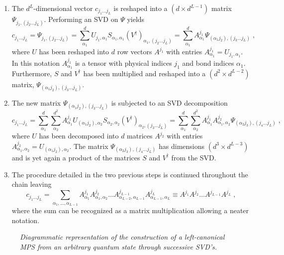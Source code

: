 \begin{enumerate}
\item
The $d^L$-dimensional vector $c_{j_1 \ldots j_L}$ is reshaped into a $(d \times d^{L-1})$ matrix $\Psi_{j_1 , (j_2 \ldots j_L)}$. Performing an SVD on $\Psi$ yields
\begin{equation}
	c_{j_1 \ldots j_L} = \Psi_{j_1 , (j_2 \ldots j_L)} = \sum_{\alpha_1}^{d} U_{j_1 , \alpha_1} S_{\alpha_1 , \alpha_1} (V^{\dag})_{\alpha_1 , (j_2 \ldots j_L)} = \sum_{\alpha_1}^{d} A_{\alpha_1}^{j_1} \Psi_{(\alpha_1 j_2),(j_3 \ldots j_L)} \; ,
\end{equation}
where $U$ has been reshaped into $d$ row vectors $A^{j_1}$ with entries $A_{\alpha_1}^{j_1} = U_{j_1 , \alpha_1}$. In this notation $A_{\alpha_1}^{j_1}$ is a tensor with physical indices $j_1$ and bond indices $\alpha_1$. Furthermore, $S$ and $V^{\dag}$ has been multiplied and reshaped into a $(d^2 \times d^{L-2})$ matrix, $\Psi_{(\alpha_1 j_2),(j_3 \ldots j_L)}$.

\item
The new matrix $\Psi_{(\alpha_1 j_2),(j_3 \ldots j_L)}$ is subjected to an SVD decomposition
\begin{equation}
	c_{j_1 \ldots j_L} = \sum_{\alpha_1}^{d} \sum_{\alpha_2}^{d^2} A_{\alpha_1}^{j_1} U_{(\alpha_1 j_2) , \alpha_2} S_{\alpha_2 , \alpha_2} (V^{\dag})_{\alpha_2 , (j_3 \ldots j_L)} = \sum_{\alpha_1}^{d} \sum_{\alpha_2}^{d^2} A_{\alpha_1}^{j_1} A_{\alpha_1 , \alpha_2}^{j_2} \Psi_{(\alpha_2 j_3),(j_4 \ldots j_L)} \; ,
\end{equation}
where $U$ has been decomposed into $d$ matrices $A^{j_2}$ with entries $A_{\alpha_1 , \alpha_2}^{j_2} = U_{(\alpha_1 j_2) , \alpha_2}$. The matrix $\Psi_{(\alpha_2 j_3),(j_4 \ldots j_L)}$ has dimensions $(d^3 \times d^{L-3})$ and is yet again a product of the matrices $S$ and $V^{\dag}$ from the SVD.

\item
The procedure detailed in the two previous steps is continued throughout the chain leaving 
\begin{equation}
	c_{j_1 \ldots j_L} = \sum_{\alpha_1 , \ldots , \alpha_{L-1}} A_{\alpha_1}^{j_1} A_{\alpha_1 , \alpha_2}^{j_2} \ldots A_{\alpha_{L-2} ,\alpha_{L-1}}^{j_{L-1}} A_{\alpha_{L-1} ,\alpha_{L}}^{j_{L}} \equiv A^{j_1} A^{j_2} \ldots A^{j_{L-1}} A^{j_{L}} \; ,
\end{equation}
where the sum can be recognized as a matrix multiplication allowing a neater notation.
\end{enumerate}
\begin{figure}[h!]
	\centering
	
	\caption{\textit{Diagrammatic representation of the construction of a left-canonical MPS from an arbitrary quantum state through successive SVD's.}}
	\label{fig:MPSbuild}
\end{figure}
